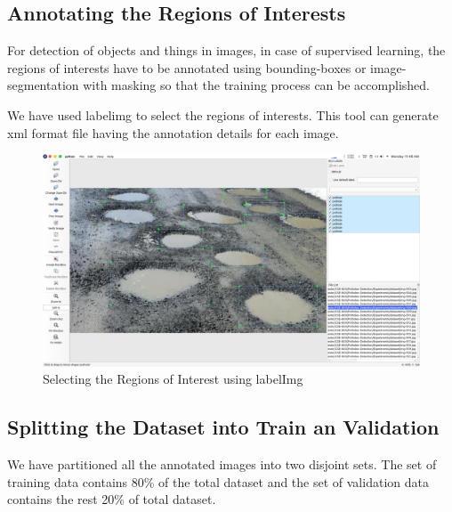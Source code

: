         \clearpage
        \subsection{Annotating the Regions of Interests}
            For detection of objects and things in images, in case of supervised learning, the regions of interests have to be annotated using bounding-boxes or image-segmentation with masking so that the training process can be accomplished.
            
            We have used \gls{labelimg} to select the regions of interests. This tool can generate \acrfull{xml} format file having the annotation details for each image.
        
            \begin{figure}[h]
                \centering
                \includegraphics[width=\textwidth]{images/labelImg.png}
                \caption{Selecting the Regions of Interest using labelImg}
                \label{fig:labelImg}
            \end{figure}
            
        \subsection{Splitting the Dataset into Train an Validation}
            We have partitioned all the annotated images into two disjoint sets. The set of training data contains 80\% of the total dataset and the set of validation data contains the rest 20\% of total dataset.
            
